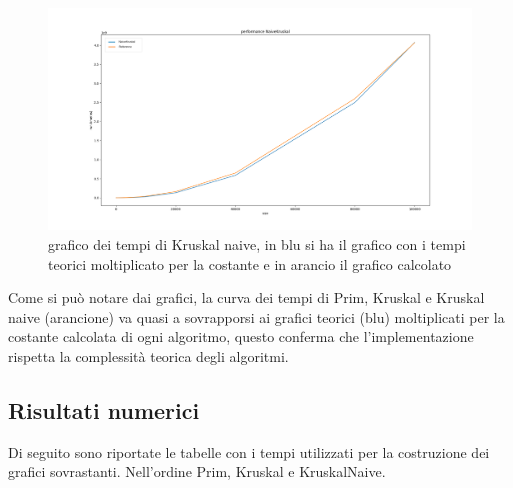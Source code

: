 \begin{figure}[htbp]
    \centering
    \centerline{\includegraphics[scale = 0.38]{Fig/NaiveKruskalFinale.png}}
    \caption{grafico dei tempi di Kruskal naive, in blu si ha il grafico con i tempi teorici moltiplicato per la costante e in arancio il grafico calcolato}
    \label{Kruskal naive}
\end{figure}


Come si può notare dai grafici, la curva dei tempi di Prim, Kruskal e Kruskal naive (arancione) va quasi a sovrapporsi ai grafici teorici (blu) moltiplicati per la costante calcolata di ogni algoritmo, questo conferma che l'implementazione rispetta la complessità teorica degli algoritmi.

\newpage
\subsection{Risultati numerici}

Di seguito sono riportate le tabelle con i tempi utilizzati per la costruzione dei grafici sovrastanti. Nell'ordine Prim, Kruskal e KruskalNaive.

